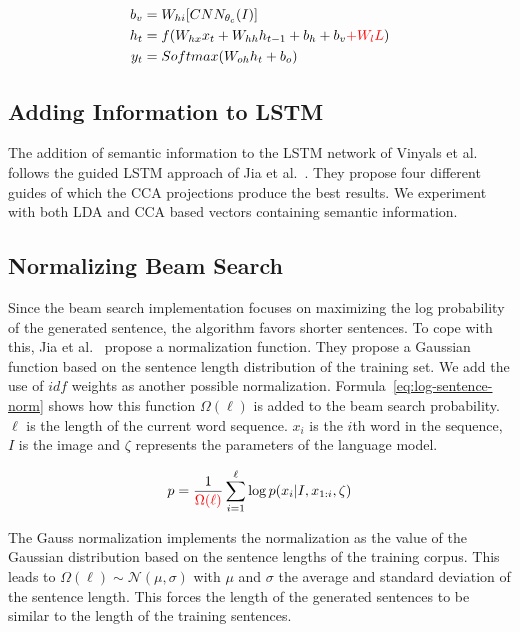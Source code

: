 \documentclass[twoside,twocolumn]{article}
\begin{document}
	\begin{align}
	\vspace{-3mm}
	\label{eq:rnnstart}
	b_v&=W_{hi} [CNN_{\theta_c}(I)] \\
	\label{eq:rnn}
	h_t&=f(W_{hx} x_{t} + W_{hh} h_{t-1} + b_h + b_v \color{red}{+W_lL}\color{black}) \\
	y_t&=Softmax( W_{oh} h_t + b_o)
	\label{eq:rnnend}
	\end{align}
	
	
	
	\subsection{Adding Information to LSTM}
	The addition of semantic information to the LSTM network of Vinyals et al.~\cite{Google} follows the guided LSTM approach of Jia et al.~\cite{Fernando2015}. They propose four different guides of which the CCA projections produce the best results. We experiment with both LDA and CCA based vectors containing semantic information.
	
	\subsection{Normalizing Beam Search}
	Since the beam search implementation focuses on maximizing the log probability of the generated sentence, the algorithm favors shorter sentences. To cope with this, Jia et al.~\cite{Fernando2015} propose a normalization function. They propose a Gaussian function based on the sentence length distribution of the training set. We add the use of $idf$ weights as another possible normalization. Formula~\eqref{eq:log-sentence-norm} shows how this function $\Omega(\ell)$ is added to the beam search probability. $\ell$ is the length of the current word sequence. $x_i$ is the $i$th word in the sequence, $I$ is the image and $\zeta$ represents the parameters of the language model. 
	
	\begin{equation}
	p = \frac{1}{\color{red}{\Omega(\ell)}}\sum_{i=1}^{\ell} \log p(x_i | I, x_{1:i}, \zeta)
	\label{eq:log-sentence-norm}
	\end{equation}
	
	The Gauss normalization implements the normalization as the value of the Gaussian distribution based on the sentence lengths of the training corpus. This leads to $\Omega(\ell) \sim \mathcal{N}(\mu, \sigma)$ with $\mu$ and $\sigma$ the average and standard deviation of the sentence length. This forces the length of the generated sentences to be similar to the length of the training sentences.
	
\end{document}
